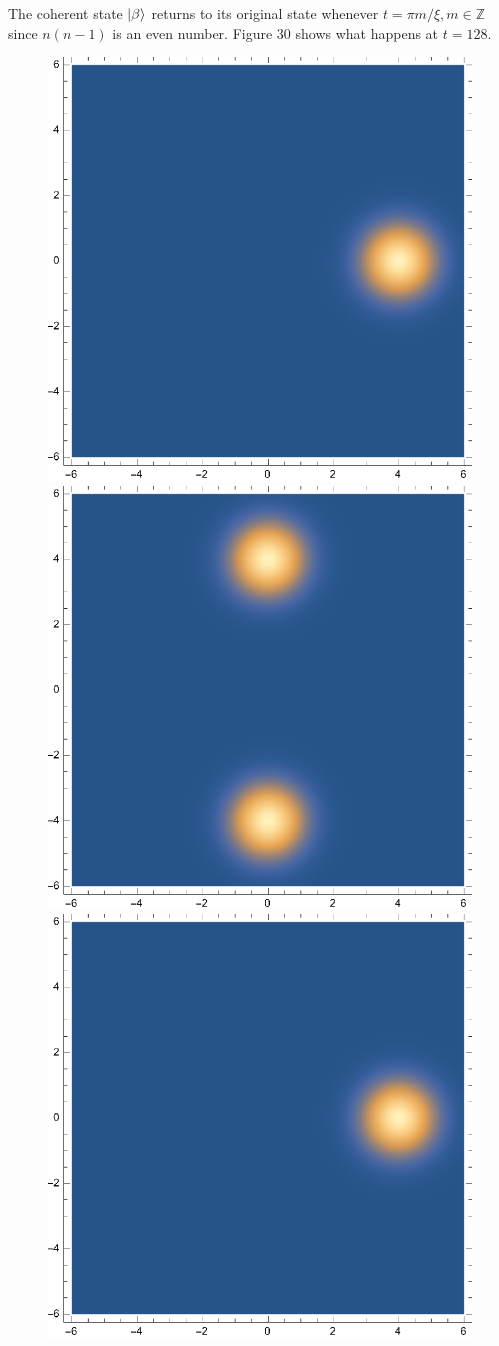 \documentclass{article}
\theoremstyle{definition}
\newcommand{\be}{\beta}
\begin{document}
\begin{enumerate}[label=\alph*)]
	
	The coherent state $\ket{\be}$ returns to its original state whenever $t = \pi m/\xi, m\in \mathbb{Z}$ since $n(n-1)$ is an even number. Figure 30 shows what happens at $t=128$.	
	\begin{figure}[!htb]
	\centering
	\begin{minipage}{.3\textwidth}
  	\centering
  	\includegraphics[width=.55\linewidth]{figures/5-t-0.eps}
	\end{minipage}%
	\begin{minipage}{.3\textwidth}
  	\centering
  	\includegraphics[width=.55\linewidth]{figures/5-t-64.eps}
	\end{minipage}
	\begin{minipage}{.3\textwidth}
  	\centering
  	\includegraphics[width=.55\linewidth]{figures/5-t-128.eps}
	\end{minipage}
	\end{figure}
	

\end{enumerate}
\end{document}
